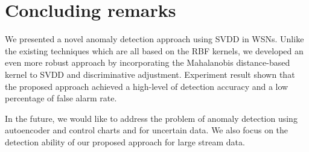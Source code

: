 \documentclass[conference]{IEEEtran}
\theoremstyle{problemstyle}
\begin{document}
\section{Concluding remarks}\label{sec:concluding}

We presented a novel anomaly detection approach using SVDD in WSNs. Unlike the existing techniques which are all based on the RBF kernels, we developed an even more robust approach by incorporating the Mahalanobis distance-based kernel to SVDD and discriminative adjustment. Experiment result shown that the proposed approach achieved a high-level of detection accuracy and a low percentage of false alarm rate.  

In the future, we would like to address the problem of anomaly detection using autoencoder and control charts and  for uncertain data. We also focus on the detection ability of our proposed approach for large stream data.



\end{document}
